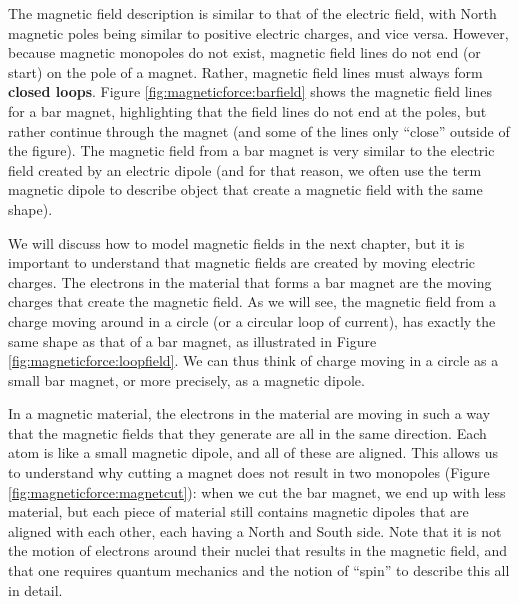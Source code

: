 The magnetic field description is similar to that of the electric field, with North magnetic poles being similar to positive electric charges, and vice versa.  However, because magnetic monopoles do not exist, magnetic field lines do not end (or start) on the pole of a magnet. Rather, magnetic field lines must always form \textbf{closed loops}. Figure \ref{fig:magneticforce:barfield} shows the magnetic field lines for a bar magnet, highlighting that the field lines do not end at the poles, but rather continue through the magnet (and some of the lines only ``close'' outside of the figure). The magnetic field from a bar magnet is very similar to the electric field created by an electric dipole (and for that reason, we often use the term magnetic dipole to describe object that create a magnetic field with the same shape).


We will discuss how to model magnetic fields in the next chapter, but it is important to understand that magnetic fields are created by moving electric charges. The electrons in the material that forms a bar magnet are the moving charges that create the magnetic field. As we will see, the magnetic field from a charge moving around in a circle (or a circular loop of current), has exactly the same shape as that of a bar magnet, as illustrated in Figure \ref{fig:magneticforce:loopfield}. We can thus think of charge moving in a circle as a small bar magnet, or more precisely, as a magnetic dipole.


In a magnetic material, the electrons in the material are moving in such a way that the magnetic fields that they generate are all in the same direction. Each atom is like a small magnetic dipole, and all of these are aligned. This allows us to understand why cutting a magnet does not result in two monopoles (Figure \ref{fig:magneticforce:magnetcut}): when we cut the bar magnet, we end up with less material, but each piece of material still contains magnetic dipoles that are aligned with each other, each having a North and South side. Note that it is not the motion of electrons around their nuclei that results in the magnetic field, and that one  requires quantum mechanics and the notion of ``spin'' to describe this all in detail. 
 
